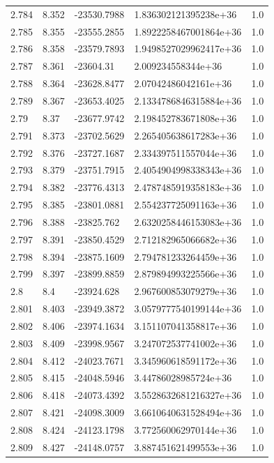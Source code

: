 \begin{tabular}{lllll}
2.784 & 8.352 & -23530.7988 & 1.836302121395238e+36 & 1.0 \\
2.785 & 8.355 & -23555.2855 & 1.8922258467001864e+36 & 1.0 \\
2.786 & 8.358 & -23579.7893 & 1.9498527029962417e+36 & 1.0 \\
2.787 & 8.361 & -23604.31 & 2.009234558344e+36 & 1.0 \\
2.788 & 8.364 & -23628.8477 & 2.07042486042161e+36 & 1.0 \\
2.789 & 8.367 & -23653.4025 & 2.1334786846315884e+36 & 1.0 \\
2.79 & 8.37 & -23677.9742 & 2.198452783671808e+36 & 1.0 \\
2.791 & 8.373 & -23702.5629 & 2.265405638617283e+36 & 1.0 \\
2.792 & 8.376 & -23727.1687 & 2.334397511557044e+36 & 1.0 \\
2.793 & 8.379 & -23751.7915 & 2.4054904998338343e+36 & 1.0 \\
2.794 & 8.382 & -23776.4313 & 2.4787485919358183e+36 & 1.0 \\
2.795 & 8.385 & -23801.0881 & 2.554237725091163e+36 & 1.0 \\
2.796 & 8.388 & -23825.762 & 2.6320258446153083e+36 & 1.0 \\
2.797 & 8.391 & -23850.4529 & 2.712182965066682e+36 & 1.0 \\
2.798 & 8.394 & -23875.1609 & 2.794781233264459e+36 & 1.0 \\
2.799 & 8.397 & -23899.8859 & 2.879894993225566e+36 & 1.0 \\
2.8 & 8.4 & -23924.628 & 2.967600853079279e+36 & 1.0 \\
2.801 & 8.403 & -23949.3872 & 3.0579777540199144e+36 & 1.0 \\
2.802 & 8.406 & -23974.1634 & 3.151107041358817e+36 & 1.0 \\
2.803 & 8.409 & -23998.9567 & 3.247072537741002e+36 & 1.0 \\
2.804 & 8.412 & -24023.7671 & 3.345960618591172e+36 & 1.0 \\
2.805 & 8.415 & -24048.5946 & 3.44786028985724e+36 & 1.0 \\
2.806 & 8.418 & -24073.4392 & 3.5528632681216327e+36 & 1.0 \\
2.807 & 8.421 & -24098.3009 & 3.6610640631528494e+36 & 1.0 \\
2.808 & 8.424 & -24123.1798 & 3.772560062970144e+36 & 1.0 \\
2.809 & 8.427 & -24148.0757 & 3.887451621499553e+36 & 1.0 \\

\end{tabular}

